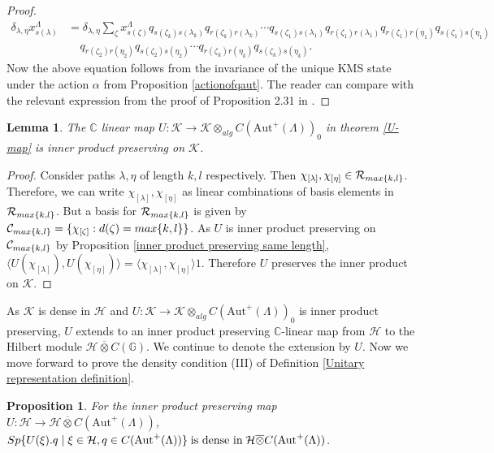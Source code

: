 \documentclass{amsart}
\theoremstyle{plain}
\newtheorem{proposition}[subsection]{Proposition}
\newtheorem{lemma}[subsection]{Lemma}
\theoremstyle{definition}
\theoremstyle{remark}
\numberwithin{equation}{section}
\newcommand{\cal}{\mathcal}
\newcommand{\clc}{{\cal C}}
\newcommand{\clh}{{\cal H}}
\newcommand{\clk}{{\cal K}}
\newcommand{\clr}{{\cal R}}
\newcommand{\raro}{\rightarrow}
\begin{document}
\begin{proof}
\begin{eqnarray*}
\delta_{\lambda,\eta}x^{\Lambda}_{s(\lambda)}&=\delta_{\lambda,\eta}\sum\limits_{\zeta}x_{s(\zeta)}^{\Lambda} q_{s(\zeta_{k})s(\lambda_{k})}q_{r(\zeta_{k})r(\lambda_{k})} \cdots q_{s(\zeta_{1})s(\lambda_{1})}q_{r(\zeta_{1})r(\lambda_{1})}q_{r(\zeta_{1})r(\eta_{1})}q_{s(\zeta_{1})s(\eta_{1})} 
\\&\;\;\;\;q_{r(\zeta_{2})r(\eta_{2})}q_{s(\zeta_{2})s(\eta_{2})} \cdots q_{r(\zeta_{k})r(\eta_{k})}q_{s(\zeta_{k})s(\eta_{k})}. 
\end{eqnarray*}
Now the above equation follows from the invariance of the unique KMS state under the action $\alpha$ from Proposition \ref{actionofqaut}. The reader can compare with the relevant expression from the proof of Proposition 2.31 in \cite{joardar2}. 
\end{proof}
\begin{lemma}
\label{inner product preserving on K}
    The $\mathbb{C}$ linear map $U: \mathcal{K}\raro \mathcal{K}\otimes_{alg} C(\text{Aut}^{+}(\Lambda))_{0}$ in theorem \ref{U-map} is inner product preserving on $\clk$. 
\end{lemma}
\begin{proof}
    Consider paths $\lambda,\eta$ of length $k,l$ respectively. Then $\chi_{[\lambda]},\chi_{[\eta]}\in \mathcal{R}_{{\rm max}\{k,l\}}$. Therefore, we can write $\chi_{[\lambda]},\chi_{[\eta]}$ as linear combinations of basis elements in $\mathcal{R}_{{\rm max}\{k,l\}}$. But a basis for $\clr_{{\rm max}\{k,l\}}$ is given by $\clc_{{\rm max}\{k,l\}}=\{\chi_{[\zeta]}:d(\zeta)={\rm max}\{k,l\}\}$. As $U$ is inner product preserving on $\clc_{{\rm max}\{k,l\}}$ by Proposition \ref{inner product preserving same length}, $\langle U(\chi_{[\lambda]}),U(\chi_{[\eta]})\rangle=\langle\chi_{[\lambda]},\chi_{[\eta]}\rangle1$. Therefore $U$ preserves the inner product on $\clk$.  
\end{proof}
As $\mathcal{K}$ is dense in $\mathcal{H}$ and $U:\mathcal{K}\raro \mathcal{K}\otimes_{alg} C(\text{Aut}^{+}(\Lambda))_{0}$ is inner product preserving, $U$ extends to an inner product preserving $\mathbb{C}$-linear map from $\clh$ to the Hilbert module $\clh\overline{\otimes}C(\mathbb{G}) $. We continue to denote the extension by $U$. Now we move forward to prove the density condition (III) of Definition \ref{Unitary representation definition}.
\begin{proposition}
\label{Udensity}
    For the inner product preserving map $U:\mathcal{H}\raro \mathcal{H} \overline{\otimes} C(\text{Aut}^{+}(\Lambda))$,
${\rm Sp}\{U(\xi).q\;|\; \xi\in \mathcal{H}, q\in C(\text{Aut}^{+}(\Lambda))\}\; \text{is dense in}\; \mathcal{H}\overline{\otimes} C(\text{Aut}^{+}(\Lambda))$.
\end{proposition}
\end{document}
